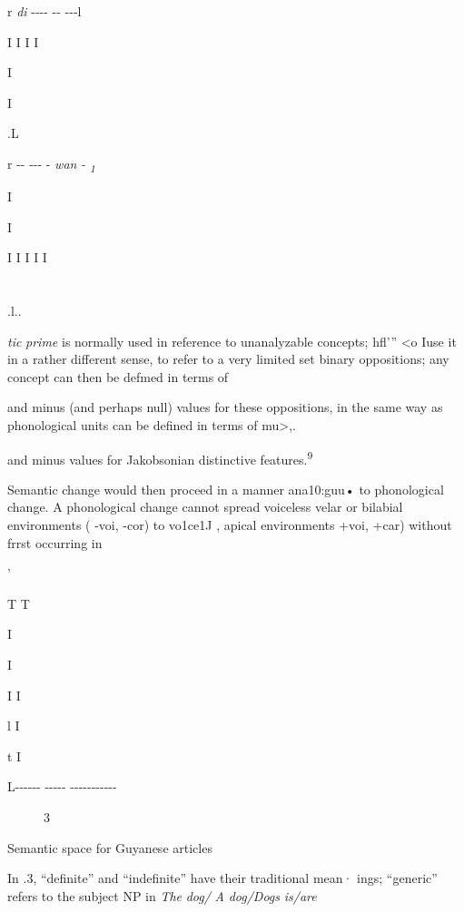 r \textit{di} {}-{}-{}-{}- {}-{}- {}-{}-{}-l

I I I I

I

I

.L

r {}-{}- {}-{}-{}- {}- \textit{wan} \textit{{}-} \textit{\textsubscript{1}}

I 

I

I I I I I

\section{}
.l..

\textit{tic} \textit{prime} is normally used in reference to unanalyzable concepts; hfl'{\textquotedbl}'' {\textless}o Iuse it in a rather different sense, to refer to a very limited set binary oppositions; any concept can then be defmed in terms of

and minus (and perhaps null) values for these oppositions, in
the same way as phonological units can be defined in terms of mu{\textgreater},.

and minus values for Jakobsonian distinctive features.\textsuperscript{9}

Semantic change would then proceed in a manner ana10:guu• to phonological change. A phonological change cannot spread voiceless velar or bilabial environments ( {}-voi, {}-cor) to vo1ce1J , apical environments +voi, +car) without frrst occurring in

'

T T

I

I

I I

l I

t I

L-{}-{}-{}-{}-{}- {}-{}-{}-{}-{}- {}-{}-{}-{}-{}-{}-{}-{}-{}-{}-{}-

\begin{figure}
\caption{3}
\label{fig:4}
\end{figure}

Semantic space for Guyanese articles



In .3, ``definite'' and ``indefinite'' have their traditional mean· ings; ``generic'' refers to the subject NP in \textit{The} \textit{dog}\textit{/} \textit{A} \textit{dog/Dogs} \textit{is/are}

